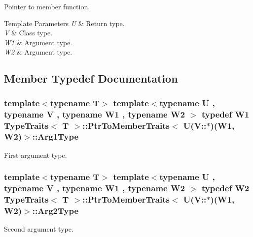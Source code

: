 Pointer to member function. 
\begin{DoxyTemplParams}{Template Parameters}
{\em U} & Return type. \\
\hline
{\em V} & Class type. \\
\hline
{\em W1} & Argument type. \\
\hline
{\em W2} & Argument type. \\
\hline
\end{DoxyTemplParams}


\subsection{Member Typedef Documentation}
\subsubsection[{\texorpdfstring{Arg1\+Type}{Arg1Type}}]{\setlength{\rightskip}{0pt plus 5cm}template$<$typename T$>$ template$<$typename U , typename V , typename W1 , typename W2 $>$ typedef W1 {\bf Type\+Traits}$<$ T $>$\+::{\bf Ptr\+To\+Member\+Traits}$<$ U(V\+::$\ast$)(W1, W2)$>$\+::{\bf Arg1\+Type}}\hypertarget{structTypeTraits_1_1PtrToMemberTraits_3_01U_07V_1_1_5_08_07W1_00_01W2_08_4_ab9ac86334caf5049af037bb614b46630}{}\label{structTypeTraits_1_1PtrToMemberTraits_3_01U_07V_1_1_5_08_07W1_00_01W2_08_4_ab9ac86334caf5049af037bb614b46630}
First argument type. 
\subsubsection[{\texorpdfstring{Arg2\+Type}{Arg2Type}}]{\setlength{\rightskip}{0pt plus 5cm}template$<$typename T$>$ template$<$typename U , typename V , typename W1 , typename W2 $>$ typedef W2 {\bf Type\+Traits}$<$ T $>$\+::{\bf Ptr\+To\+Member\+Traits}$<$ U(V\+::$\ast$)(W1, W2)$>$\+::{\bf Arg2\+Type}}\hypertarget{structTypeTraits_1_1PtrToMemberTraits_3_01U_07V_1_1_5_08_07W1_00_01W2_08_4_a2a852ccf8e733e1a0cd3b8b19edd2a12}{}\label{structTypeTraits_1_1PtrToMemberTraits_3_01U_07V_1_1_5_08_07W1_00_01W2_08_4_a2a852ccf8e733e1a0cd3b8b19edd2a12}
Second argument type. 
